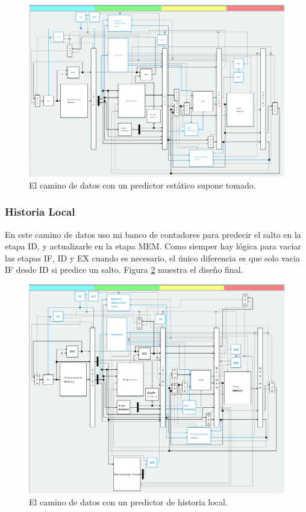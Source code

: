 \documentclass[a4paper]{article}
\begin{document}
\begin{figure}[!htb]
\centering
\includegraphics[scale=0.4]{./img/predict_taken_drmips}
\caption{El camino de datos con un predictor estático supone tomado.}
\label{fig:predict_taken_drmips}
\end{figure}

\subsubsection{Historia Local}

En este camino de datos uso mi banco de contadores para predecir el salto en la etapa ID, y actualizarle en la etapa MEM. Como siemper hay lógica para vaciar las etapas IF, ID y EX cuando es necesario, el único diferencia es que solo vacia IF desde ID si predice un salto. Figura \ref{fig:local_history_drmips} muestra el diseño final.

\begin{figure}[!htb]
\centering
\includegraphics[scale=0.4]{./img/local_history_drmips}
\caption{El camino de datos con un predictor de historia local.}
\label{fig:local_history_drmips}
\end{figure}
\end{document}
